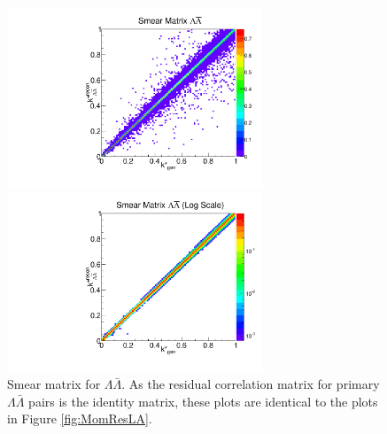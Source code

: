 \begin{figure}[h]
\begin{minipage}{18pc}
\includegraphics[width=18pc]{Figures/SmearMatrices/2016-7-19-SmearMatrixLambdaLambdaNormLA.pdf}
\end{minipage}\hspace{2pc}
\begin{minipage}{18pc}
\includegraphics[width=18pc]{Figures/SmearMatrices/2016-7-19-SmearMatrixLambdaLambdaNormLALog.pdf}
\end{minipage} 
\caption[Smear matrix -- $\Lambda\bar{\Lambda}$]{\label{fig:SmearLA} 
Smear matrix for $\Lambda\bar{\Lambda}$. As the residual correlation matrix for primary $\Lambda\bar{\Lambda}$ pairs is the identity matrix, these plots are identical to the plots in Figure \ref{fig:MomResLA}.}
\end{figure}

